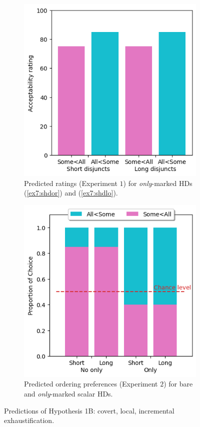 \begin{figure}[H]
\begin{subfigure}[t]{.32\linewidth}
		\includegraphics[width=\linewidth]{./images/pred-1b-only.png}
		\caption[]{Predicted ratings (Experiment $1$) for \textit{only}-marked HDs (\ref{ex7:shdor}) and (\ref{ex7:shdlo}).}
	\end{subfigure}
	\hfill
	\begin{subfigure}[t]{.32\linewidth}
		\centering
		\includegraphics[width=\linewidth]{./images/pred-1b-pref.png}
		\caption[]{Predicted ordering preferences (Experiment $2$) for bare and \textit{only}-marked scalar HDs.}
	\end{subfigure}
	\caption[]{Predictions of Hypothesis 1B: covert, local, incremental exhaustification.}\label{fig7:predictions-exh-incr}
\end{figure} 


